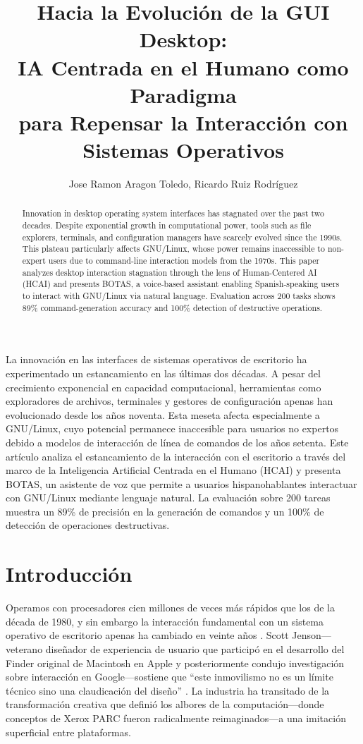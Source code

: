 \documentclass[12pt]{article}
\title{Hacia la Evolución de la GUI Desktop:\\ IA Centrada en el Humano como Paradigma\\ para Repensar la Interacción con Sistemas Operativos}
\author{Jose Ramon Aragon Toledo\inst{1}, Ricardo Ruiz Rodríguez\inst{1}}
\begin{document}
\maketitle

\begin{abstract}
Innovation in desktop operating system interfaces has stagnated over the past two
decades. Despite exponential growth in computational power, tools such as file
explorers, terminals, and configuration managers have scarcely evolved since the
1990s. This plateau particularly affects GNU/Linux, whose power remains inaccessible
to non-expert users due to command-line interaction models from the 1970s. This paper
analyzes desktop interaction stagnation through the lens of Human-Centered AI (HCAI)
and presents BOTAS, a voice-based assistant enabling Spanish-speaking users to
interact with GNU/Linux via natural language. Evaluation across 200 tasks shows
89\% command-generation accuracy and 100\% detection of destructive operations.
\end{abstract}

\begin{resumo}
La innovación en las interfaces de sistemas operativos de escritorio ha
experimentado un estancamiento en las últimas dos décadas. A pesar del crecimiento
exponencial en capacidad computacional, herramientas como exploradores de archivos,
terminales y gestores de configuración apenas han evolucionado desde los años
noventa. Esta meseta afecta especialmente a GNU/Linux, cuyo potencial permanece
inaccesible para usuarios no expertos debido a modelos de interacción de línea de
comandos de los años setenta. Este artículo analiza el estancamiento de la
interacción con el escritorio a través del marco de la Inteligencia Artificial
Centrada en el Humano (HCAI) y presenta BOTAS, un asistente de voz que permite a
usuarios hispanohablantes interactuar con GNU/Linux mediante lenguaje natural. La
evaluación sobre 200 tareas muestra un 89\% de precisión en la generación de
comandos y un 100\% de detección de operaciones destructivas.
\end{resumo}


\section{Introducción}
\label{sec:intro}

\noindent
Operamos con procesadores cien millones de veces más rápidos que los de la década
de 1980, y sin embargo la interacción fundamental con un sistema operativo de
escritorio apenas ha cambiado en veinte años \cite{Jenson2024}. Scott
Jenson---veterano diseñador de experiencia de usuario que participó en el
desarrollo del Finder original de Macintosh en Apple y posteriormente condujo
investigación sobre interacción en Google---sostiene que ``este inmovilismo no es
un límite técnico sino una claudicación del diseño'' \cite{Jenson2024}. La
industria ha transitado de la transformación creativa que definió los albores de
la computación---donde conceptos de Xerox PARC fueron radicalmente
reimaginados---a una imitación superficial entre plataformas.
\end{document}
